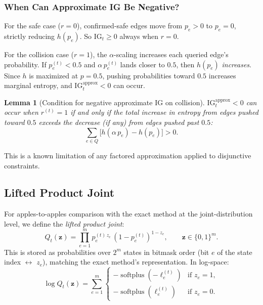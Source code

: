 \documentclass[11pt]{article}
\DeclareMathOperator{\softplus}{softplus}
\newtheorem{lemma}{Lemma}
\begin{document}
\subsubsection{When Can Approximate IG Be Negative?}

For the safe case ($r = 0$), confirmed-safe edges move from $p_e > 0$ to
$p_e = 0$, strictly reducing $h(p_e)$.  So $\mathrm{IG}_t \geq 0$ always
when $r = 0$.

For the collision case ($r = 1$), the $\alpha$-scaling increases each
queried edge's probability.  If $p_e^{(t)} < 0.5$ and
$\alpha\, p_e^{(t)}$ lands closer to $0.5$, then $h(p_e)$ \emph{increases}.
Since $h$ is maximized at $p = 0.5$, pushing probabilities toward $0.5$
increases marginal entropy, and
$\mathrm{IG}_t^{\text{approx}} < 0$ can occur.

\begin{lemma}[Condition for negative approximate IG on collision]
$\mathrm{IG}_t^{\text{approx}} < 0$ can occur when $r^{(t)} = 1$ if and
only if the total increase in entropy from edges pushed toward $0.5$
exceeds the decrease (if any) from edges pushed past $0.5$:
\[
  \sum_{e \in Q} \bigl[h(\alpha\, p_e) - h(p_e)\bigr] > 0.
\]
\end{lemma}

This is a known limitation of any factored approximation applied to
disjunctive constraints.

\subsection{Lifted Product Joint}
\label{sec:lifted-joint}

For apples-to-apples comparison with the exact method at the
joint-distribution level, we define the \emph{lifted product joint}:
\[
  Q_t(\mathbf{z}) = \prod_{e=1}^{m} p_e^{(t)\,z_e}\,(1-p_e^{(t)})^{1-z_e},
  \qquad \mathbf{z} \in \{0,1\}^m.
\]
This is stored as probabilities over $2^m$ states in bitmask order
(bit $e$ of the state index $\leftrightarrow$ $z_e$), matching the exact
method's representation.  In log-space:
\begin{equation}
  \log Q_t(\mathbf{z})
  = \sum_{e=1}^{m}
    \begin{cases}
      -\softplus(-\ell_e^{(t)}) & \text{if } z_e = 1, \\[2pt]
      -\softplus(\ell_e^{(t)})  & \text{if } z_e = 0.
    \end{cases}
  \label{eq:lifted-log}
\end{equation}
\end{document}
